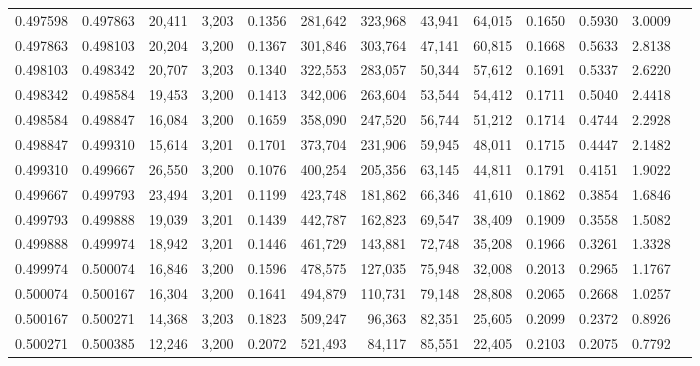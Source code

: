 \begin{tabular}{rrrrrrrrrrrrr}
0.497598 & 0.497863 & 20,411 & 3,203 &                                     0.1356 & 281,642 & 323,968 &  43,941 &  64,015 & 0.1650 & 0.5930 & 3.0009 \\
0.497863 & 0.498103 & 20,204 & 3,200 &                                     0.1367 & 301,846 & 303,764 &  47,141 &  60,815 & 0.1668 & 0.5633 & 2.8138 \\
0.498103 & 0.498342 & 20,707 & 3,203 &                                     0.1340 & 322,553 & 283,057 &  50,344 &  57,612 & 0.1691 & 0.5337 & 2.6220 \\
0.498342 & 0.498584 & 19,453 & 3,200 &                                     0.1413 & 342,006 & 263,604 &  53,544 &  54,412 & 0.1711 & 0.5040 & 2.4418 \\
0.498584 & 0.498847 & 16,084 & 3,200 &                                     0.1659 & 358,090 & 247,520 &  56,744 &  51,212 & 0.1714 & 0.4744 & 2.2928 \\
0.498847 & 0.499310 & 15,614 & 3,201 &                                     0.1701 & 373,704 & 231,906 &  59,945 &  48,011 & 0.1715 & 0.4447 & 2.1482 \\
0.499310 & 0.499667 & 26,550 & 3,200 &                                     0.1076 & 400,254 & 205,356 &  63,145 &  44,811 & 0.1791 & 0.4151 & 1.9022 \\
0.499667 & 0.499793 & 23,494 & 3,201 &                                     0.1199 & 423,748 & 181,862 &  66,346 &  41,610 & 0.1862 & 0.3854 & 1.6846 \\
0.499793 & 0.499888 & 19,039 & 3,201 &                                     0.1439 & 442,787 & 162,823 &  69,547 &  38,409 & 0.1909 & 0.3558 & 1.5082 \\
0.499888 & 0.499974 & 18,942 & 3,201 &                                     0.1446 & 461,729 & 143,881 &  72,748 &  35,208 & 0.1966 & 0.3261 & 1.3328 \\
0.499974 & 0.500074 & 16,846 & 3,200 &                                     0.1596 & 478,575 & 127,035 &  75,948 &  32,008 & 0.2013 & 0.2965 & 1.1767 \\
0.500074 & 0.500167 & 16,304 & 3,200 &                                     0.1641 & 494,879 & 110,731 &  79,148 &  28,808 & 0.2065 & 0.2668 & 1.0257 \\
0.500167 & 0.500271 & 14,368 & 3,203 &                                     0.1823 & 509,247 &  96,363 &  82,351 &  25,605 & 0.2099 & 0.2372 & 0.8926 \\
0.500271 & 0.500385 & 12,246 & 3,200 &                                     0.2072 & 521,493 &  84,117 &  85,551 &  22,405 & 0.2103 & 0.2075 & 0.7792 \\

\end{tabular}
